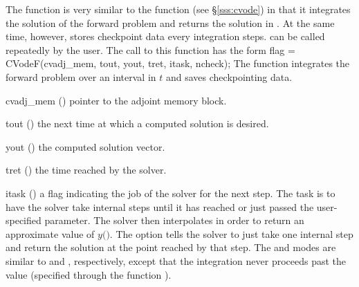 The function  is very similar to the {\cvodes} function 
(see \S\ref{sss:cvode}) in that it integrates the solution of the forward
problem and returns the solution in . At the same time,
however,  stores checkpoint data every  integration steps.
 can be called repeatedly by the user.
The call to this function has the form
{
  flag = CVodeF(cvadj\_mem, tout, yout, tret, itask, ncheck);
}
{
  The function  integrates the forward problem over an interval in $t$
  and saves checkpointing data.
}
{
  \begin{args}
  \item[cvadj\_mem] ()
    pointer to the adjoint memory block.
  \item[tout] ()
    the next time at which a computed solution is desired.
  \item[yout] ()
    the computed solution vector.
  \item[tret] ()
    the time reached by the solver.
  \item[itask] ()
    a flag indicating the job of the solver for the next step. 
    The  task is to have the solver take internal steps until   
    it has reached or just passed the user-specified 
    parameter. The solver then interpolates in order to   
    return an approximate value of $y($$)$. 
    The  option tells the solver to just take one internal step  
    and return the solution at the point reached by that step. 
    The  and  modes are     
    similar to  and , respectively, except    
    that the integration never proceeds past the value      
     (specified through the function ).
  \end{args}
}
